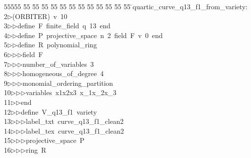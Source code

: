 %
%
\begin{tabbing}
55555 \= 55 \= 55 \= 55 \= 55 \= 55 \= 55 \= 55 \= 55 \= 55 \= 55 \= 55 \= 55 \= \>quartic\_curve\_q13\_f1\_from\_variety:\\[0pt]
2\>$\triangleright$\>(ORBITER)\ v\ 10\ \\[0pt]
3\>$\triangleright$\>$\triangleright$\>define\ F\ finite\_field\ q\ 13\ end\ \\[0pt]
4\>$\triangleright$\>$\triangleright$\>define\ P\ projective\_space\ n\ 2\ field\ F\ v\ 0\ end\ \\[0pt]
5\>$\triangleright$\>$\triangleright$\>define\ R\ polynomial\_ring\ \\[0pt]
6\>$\triangleright$\>$\triangleright$\>$\triangleright$\>field\ F\ \\[0pt]
7\>$\triangleright$\>$\triangleright$\>$\triangleright$\>number\_of\_variables\ 3\ \\[0pt]
8\>$\triangleright$\>$\triangleright$\>$\triangleright$\>homogeneous\_of\_degree\ 4\ \\[0pt]
9\>$\triangleright$\>$\triangleright$\>$\triangleright$\>monomial\_ordering\_partition\ \\[0pt]
10\>$\triangleright$\>$\triangleright$\>$\triangleright$\>variables\ x1x2x3\ x\_1x\_2x\_3\ \\[0pt]
11\>$\triangleright$\>$\triangleright$\>end\ \\[0pt]
12\>$\triangleright$\>$\triangleright$\>define\ V\_q13\_f1\ variety\ \\[0pt]
13\>$\triangleright$\>$\triangleright$\>$\triangleright$\>label\_txt\ curve\_q13\_f1\_clean2\ \\[0pt]
14\>$\triangleright$\>$\triangleright$\>$\triangleright$\>label\_tex\ curve\_q13\_f1\_clean2\ \\[0pt]
15\>$\triangleright$\>$\triangleright$\>$\triangleright$\>projective\_space\ P\ \\[0pt]
16\>$\triangleright$\>$\triangleright$\>$\triangleright$\>ring\ R\ \\[0pt]

\end{tabbing}
